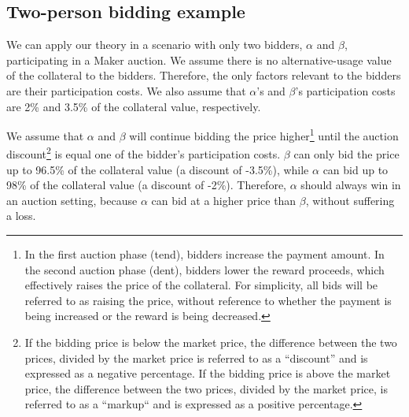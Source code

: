 \documentclass[conference]{IEEEtran}
\begin{document}
\subsection{Two-person bidding example}
We can apply our theory in a scenario with only two bidders, $\alpha$ and $\beta$, participating in a Maker auction. We assume there is no alternative-usage value of the collateral to the bidders. Therefore, the only factors relevant to the bidders are their participation costs. We also assume that $\alpha$'s and $\beta$'s participation costs are 2\% and 3.5\% of the collateral value, respectively.

We assume that $\alpha$ and $\beta$ will continue bidding the price higher\footnote{In the first auction phase (tend), bidders increase the payment amount. In the second auction phase (dent), bidders lower the reward proceeds, which effectively raises the price of the collateral. For simplicity, all bids will be referred to as raising the price, without reference to whether the payment is being increased or the reward is being decreased.} until the auction discount\footnote{If the bidding price is below the market price, the difference between the two prices, divided by the market price is referred to as a ``discount'' and is expressed as a negative percentage. If the bidding price is above the market price, the difference between the two prices, divided by the market price, is referred to as a ``markup`` and is expressed as a positive percentage.} is equal one of the bidder's participation costs. $\beta$ can only bid the price up to 96.5\% of the collateral value (a discount of -3.5\%), while $\alpha$ can bid up to 98\% of the collateral value (a discount of -2\%). Therefore, $\alpha$ should always win in an auction setting, because $\alpha$ can bid at a higher price than $\beta$, without suffering a loss.
\end{document}
